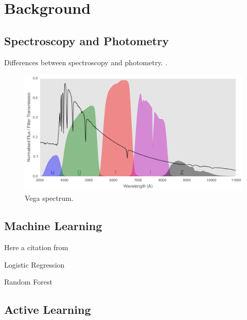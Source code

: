 
\chapter{Background}
\label{cha:firstexp}

\section{Spectroscopy and Photometry}
\label{sec:why1}

Differences between spectroscopy and photometry.
.

\begin{figure}[h]
	\centering
	\includegraphics[width=\textwidth]{figures/vega_filters_and_spectrum}
	\caption{Vega spectrum.}
	\label{fig:vega}
\end{figure}



\section{Machine Learning}
\label{sec:what1}

Here a citation from \cite{wolf14}

Logistic Regression

Random Forest



\section{Active Learning}
\label{sec:active_background}


